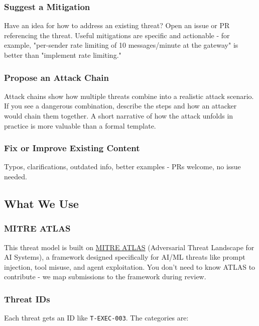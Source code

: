 \subsubsection{Suggest a Mitigation}


Have an idea for how to address an existing threat? Open an issue or PR referencing the threat. Useful mitigations are specific and actionable - for example, "per-sender rate limiting of 10 messages/minute at the gateway" is better than "implement rate limiting."

\subsubsection{Propose an Attack Chain}


Attack chains show how multiple threats combine into a realistic attack scenario. If you see a dangerous combination, describe the steps and how an attacker would chain them together. A short narrative of how the attack unfolds in practice is more valuable than a formal template.

\subsubsection{Fix or Improve Existing Content}


Typos, clarifications, outdated info, better examples - PRs welcome, no issue needed.

\subsection{What We Use}


\subsubsection{MITRE ATLAS}


This threat model is built on \href{https://atlas.mitre.org/}{MITRE ATLAS} (Adversarial Threat Landscape for AI Systems), a framework designed specifically for AI/ML threats like prompt injection, tool misuse, and agent exploitation. You don't need to know ATLAS to contribute - we map submissions to the framework during review.

\subsubsection{Threat IDs}


Each threat gets an ID like \texttt{T-EXEC-003}. The categories are:


